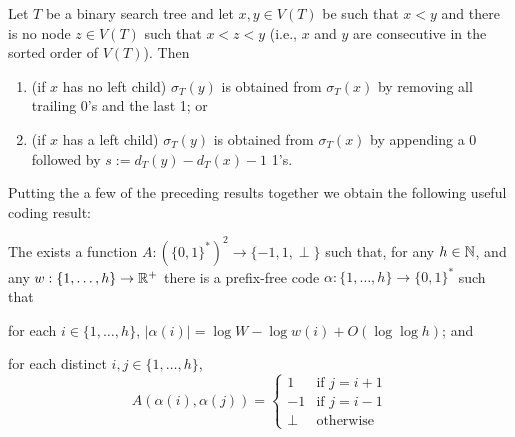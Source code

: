 \documentclass[kpfonts]{patmorin}
\begin{document}
\begin{lem}
  Let $T$ be a binary search tree and let $x,y\in V(T)$ be such that $x<y$ and there is no node $z\in V(T)$ such that $x<z<y$ (i.e., $x$ and $y$ are consecutive in the sorted order of $V(T)$).  Then
  \begin{enumerate}
    \item (if $x$ has no left child) $\sigma_T(y)$ is obtained from $\sigma_T(x)$ by removing all trailing 0's and the last 1; or
    \item (if $x$ has a left child) $\sigma_T(y)$ is obtained from $\sigma_T(x)$ by appending a 0 followed by $s:=d_T(y)-d_T(x)-1$ 1's.
  \end{enumerate}
\end{lem}

Putting the a few of the preceding results together we obtain the following useful coding result:

\begin{lem}
  The exists a function $A:(\{0,1\}^*)^2\to\{-1,1,\perp\}$ such that, for any $h\in\mathbb{N}$, and any $w:\{1,\ldots,h\}\to\mathbb{R}^+$ there is a prefix-free code $\alpha:\{1,\ldots,h\}\to \{0,1\}^*$ such that 
  \begin{compactenum}
    \item for each $i\in\{1,\ldots,h\}$, $|\alpha(i)|=\log W -\log w(i) + O(\log\log h)$; and
    \item for each distinct $i,j\in\{1,\ldots,h\}$, 
    \[   A(\alpha(i),\alpha(j)) 
    = \begin{cases}
       1 & \text{if $j=i+1$} \\
       -1 & \text{if $j=i-1$} \\
       \perp & \text{otherwise}
      \end{cases}
      \]
    \end{compactenum}
\end{lem}
\end{document}
